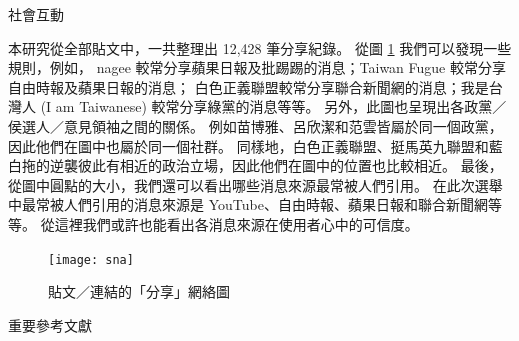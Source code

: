\documentclass[final,hyperref={pdfpagelabels=false}]{beamer}
\begin{document}
\begin{CJK}{UTF8}{bsmi}
\begin{frame}
\begin{minipage}{0.65\textwidth}
\begin{block}{社會互動}
\begin{minipage}{0.54\textwidth}
  本研究從全部貼文中，一共整理出 12,428 筆分享紀錄。%
  從圖 \ref{f4} 我們可以發現一些規則，例如，%
  nagee 較常分享蘋果日報及批踢踢的消息；Taiwan Fugue 較常分享自由時報及蘋果日報的消息；%
  白色正義聯盟較常分享聯合新聞網的消息；我是台灣人 (I am Taiwanese) 較常分享綠黨的消息等等。%
  另外，此圖也呈現出各政黨／侯選人／意見領袖之間的關係。%
  例如苗博雅、呂欣潔和范雲皆屬於同一個政黨，因此他們在圖中也屬於同一個社群。%
  同樣地，白色正義聯盟、挺馬英九聯盟和藍白拖的逆襲彼此有相近的政治立場，因此他們在圖中的位置也比較相近。%
  最後，從圖中圓點的大小，我們還可以看出哪些消息來源最常被人們引用。%
  在此次選舉中最常被人們引用的消息來源是 YouTube、自由時報、蘋果日報和聯合新聞網等等。%
  從這裡我們或許也能看出各消息來源在使用者心中的可信度。%
\end{minipage}
\quad
\begin{minipage}{0.39\textwidth}
  \begin{figure}[!htbp]
  \setlength{\abovecaptionskip}{0pt plus 0pt minus 0pt}
  \setlength{\belowcaptionskip}{0pt plus 0pt minus 0pt}
  \centering
  \texttt{[image: sna]}
  \caption{貼文／連結的「分享」網絡圖}
  \label{f4}
  \end{figure}
\end{minipage}
\end{block}
\end{minipage}
\quad
\begin{minipage}{0.33\textwidth}
\begin{block}{重要參考文獻}
  \nocite{*}
  
    
\end{block}
\end{minipage}

\end{frame}
\end{CJK}
\end{document}
